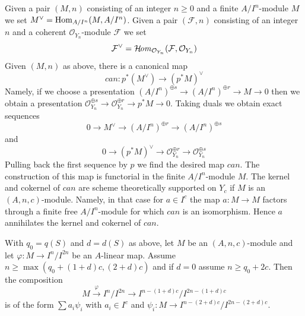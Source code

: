 \begin{remark}
\label{remark-duals}
Given a pair $(M, n)$ consisting of an integer $n \geq 0$
and a finite $A/I^n$-module $M$ we set $M^\vee = \mathop{\mathrm{Hom}}\nolimits_{A/I^n}(M, A/I^n)$.
Given a pair $(\mathcal{F}, n)$ consisting of an integer $n$ and
a coherent $\mathcal{O}_{Y_n}$-module $\mathcal{F}$ we set
$$
\mathcal{F}^\vee =
\mathop{\mathcal{H}\!\mathit{om}}\nolimits_{\mathcal{O}_{Y_n}}(\mathcal{F}, \mathcal{O}_{Y_n})
$$
Given $(M, n)$ as above, there is a canonical map
$$
can : p^*(M^\vee) \longrightarrow (p^*M)^\vee
$$
Namely, if we choose a presentation
$(A/I^n)^{\oplus s} \to (A/I^n)^{\oplus r} \to M \to 0$
then we obtain a presentation
$\mathcal{O}_{Y_n}^{\oplus s} \to \mathcal{O}_{Y_n}^{\oplus r} \to
p^*M \to 0$. Taking duals we obtain exact sequences
$$
0 \to M^\vee \to (A/I^n)^{\oplus r} \to (A/I^n)^{\oplus s}
$$
and
$$
0 \to (p^*M)^\vee \to
\mathcal{O}_{Y_n}^{\oplus r} \to
\mathcal{O}_{Y_n}^{\oplus s}
$$
Pulling back the first sequence by $p$ we find the desired map $can$.
The construction of this map is functorial in the finite
$A/I^n$-module $M$. The kernel and cokernel of $can$
are scheme theoretically supported
on $Y_c$ if $M$ is an $(A, n, c)$-module. Namely, in that case for
$a \in I^c$ the map $a : M \to M$ factors through a finite free
$A/I^n$-module for which $can$ is an isomorphism. Hence $a$ annihilates
the kernel and cokernel of $can$.
\end{remark}

\begin{lemma}
\label{lemma-factor-hom}
With $q_0 = q(S)$ and $d = d(S)$ as above, let $M$ be an $(A, n, c)$-module
and let $\varphi : M \to I^n/I^{2n}$ be an $A$-linear map. Assume
$n \geq \max(q_0 + (1 + d)c, (2 + d)c)$ and if $d = 0$ assume
$n \geq q_0 + 2c$. Then the composition
$$
M \xrightarrow{\varphi} I^n/I^{2n} \to
I^{n - (1 + d)c}/I^{2n - (1 + d)c}
$$
is of the form $\sum a_i \psi_i$ with $a_i \in I^c$ and
$\psi_i : M \to I^{n - (2 + d)c}/I^{2n - (2 + d)c}$.
\end{lemma}

